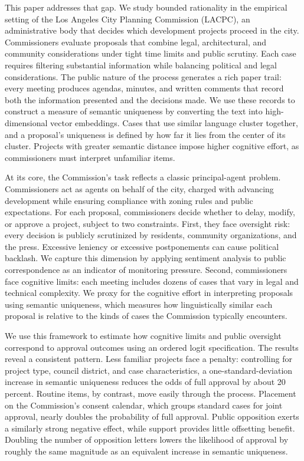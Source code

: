 This paper addresses that gap. We study bounded rationality in the empirical setting of the Los Angeles City Planning Commission (LACPC), an administrative body that decides which development projects proceed in the city. Commissioners evaluate proposals that combine legal, architectural, and community considerations under tight time limits and public scrutiny. Each case requires filtering substantial information while balancing political and legal considerations. The public nature of the process generates a rich paper trail: every meeting produces agendas, minutes, and written comments that record both the information presented and the decisions made. We use these records to construct a measure of semantic uniqueness by converting the text into high-dimensional vector embeddings. Cases that use similar language cluster together, and a proposal's uniqueness is defined by how far it lies from the center of its cluster. Projects with greater semantic distance impose higher cognitive effort, as commissioners must interpret unfamiliar items.

At its core, the Commission's task reflects a classic principal-agent problem. Commissioners act as agents on behalf of the city, charged with advancing development while ensuring compliance with zoning rules and public expectations. For each proposal, commissioners decide whether to delay, modify, or approve a project, subject to two constraints. First, they face oversight risk: every decision is publicly scrutinized by residents, community organizations, and the press. Excessive leniency or excessive postponements can cause political backlash. We capture this dimension by applying sentiment analysis to public correspondence as an indicator of monitoring pressure. Second, commissioners face cognitive limits: each meeting includes dozens of cases that vary in legal and technical complexity. We proxy for the cognitive effort in interpreting proposals using semantic uniqueness, which measures how linguistically similar each proposal is relative to the kinds of cases the Commission typically encounters. 

We use this framework to estimate how cognitive limits and public oversight correspond to approval outcomes using an ordered logit specification. The results reveal a consistent pattern. Less familiar projects face a penalty: controlling for project type, council district, and case characteristics, a one-standard-deviation increase in semantic uniqueness reduces the odds of full approval by about 20 percent. Routine items, by contrast, move easily through the process. Placement on the Commission's consent calendar, which groups standard cases for joint approval, nearly doubles the probability of full approval. Public opposition exerts a similarly strong negative effect, while support provides little offsetting benefit. Doubling the number of opposition letters lowers the likelihood of approval by roughly the same magnitude as an equivalent increase in semantic uniqueness.


